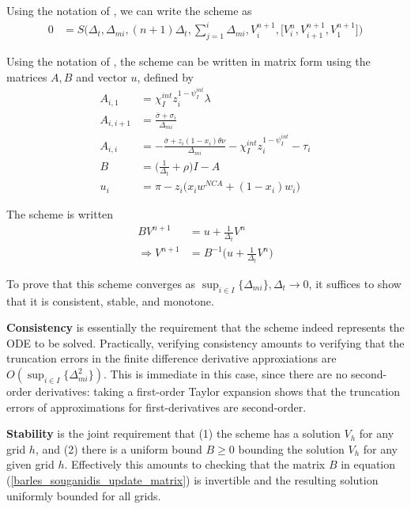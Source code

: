 \documentclass[12pt,english]{article}
\theoremstyle{remark}
\begin{document}
Using the notation of \cite{tourin_introduction_2013}, we can write the scheme as
\begin{align}
	0 &= S\Big(\Delta_t, \Delta_{mi}, (n+1)\Delta_t , \sum_{j=1}^i \Delta_{mi}, V_i^{n+1}, \big[V_i^n, V_{i+1}^{n+1}, V_1^{n+1}\big]\Big)
\end{align}

Using the notation of \cite{achdou_income_2017}, the scheme can be written in matrix form using the matrices $A,B$ and vector $u$, defined by 
\begin{align*}
	A_{i,1} &= \chi_I^{int} z_i^{1-\psi_I^{int}} \lambda \\
	A_{i,i+1} &= \frac{\bar{\sigma} + \sigma_i}{\Delta_{mi}}  \\
	A_{i,i} &= -\frac{\bar{\sigma} +z_i (1-x_i) \theta \nu }{\Delta_{mi}} - \chi_I^{int} z_i^{1-\psi_I^{int}} - \tau_i \\
	B &= \Big( \frac{1}{\Delta_t} + \rho \Big) I - A  \\
	u_i &= \pi - z_i \Big( x_i w^{NCA} + (1-x_i) w_i\Big)
\end{align*}

The scheme is written
\begin{align}
	B V^{n+1} &= u + \frac{1}{\Delta_t} V^n \nonumber \\ 
	\Rightarrow V^{n+1} &= B^{-1} \Big( u + \frac{1}{\Delta_t} V^n \Big) \label{barles_souganidis_update_matrix}
\end{align}

To prove that this scheme converges as $\sup_{i \in I} \{\Delta_{mi} \}, \Delta_t \to 0$, it suffices to show that it is consistent, stable, and monotone. 

\textbf{Consistency} is essentially the requirement that the scheme indeed represents the ODE to be solved. Practically, verifying consistency amounts to verifying that the truncation errors in the finite difference derivative approxiations are $O(\sup_{i \in I}\{\Delta_{mi}^2 \})$. This is immediate in this case, since there are no second-order derivatives: taking a first-order Taylor expansion shows that the truncation errors of approximations for first-derivatives are second-order.

\textbf{Stability} is the joint requirement that (1) the scheme has a solution $V_h$ for any grid $h$, and (2) there is a uniform bound $B \ge 0$ bounding the solution $V_h$ for any given grid $h$. Effectively this amounts to checking that the matrix $B$ in equation (\ref{barles_souganidis_update_matrix}) is invertible and the resulting solution uniformly bounded for all grids. 
\end{document}
